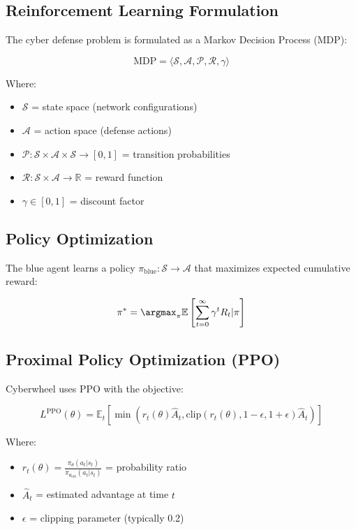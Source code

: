 \documentclass[12pt,a4paper]{article}
\begin{document}
\subsection{Reinforcement Learning Formulation}
The cyber defense problem is formulated as a Markov Decision Process (MDP):

\begin{equation}
\text{MDP} = \langle \mathcal{S}, \mathcal{A}, \mathcal{P}, \mathcal{R}, \gamma \rangle
\end{equation}

Where:
\begin{itemize}
    \item $\mathcal{S}$ = state space (network configurations)
    \item $\mathcal{A}$ = action space (defense actions)
    \item $\mathcal{P}: \mathcal{S} \times \mathcal{A} \times \mathcal{S} \rightarrow [0,1]$ = transition probabilities
    \item $\mathcal{R}: \mathcal{S} \times \mathcal{A} \rightarrow \mathbb{R}$ = reward function
    \item $\gamma \in [0,1]$ = discount factor
\end{itemize}

\subsection{Policy Optimization}
The blue agent learns a policy $\pi_{\text{blue}}: \mathcal{S} \rightarrow \mathcal{A}$ that maximizes expected cumulative reward:

\begin{equation}
\pi^* = \argmax_\pi \mathbb{E}\left[\sum_{t=0}^{\infty} \gamma^t R_t | \pi\right]
\end{equation}

\subsection{Proximal Policy Optimization (PPO)}
Cyberwheel uses PPO with the objective:

\begin{equation}
L^{\text{PPO}}(\theta) = \mathbb{E}_t\left[\min\left(r_t(\theta)\hat{A}_t, \text{clip}(r_t(\theta), 1-\epsilon, 1+\epsilon)\hat{A}_t\right)\right]
\end{equation}

Where:
\begin{itemize}
    \item $r_t(\theta) = \frac{\pi_\theta(a_t|s_t)}{\pi_{\theta_{\text{old}}}(a_t|s_t)}$ = probability ratio
    \item $\hat{A}_t$ = estimated advantage at time $t$
    \item $\epsilon$ = clipping parameter (typically 0.2)
\end{itemize}
\end{document}
